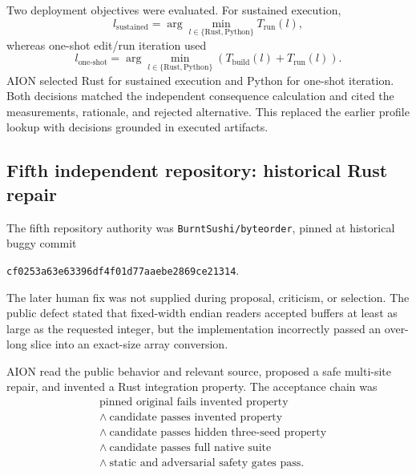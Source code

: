 Two deployment objectives were evaluated.  For sustained execution,
\begin{equation}
l_{\mathrm{sustained}}
=\arg\min_{l\in\{\mathrm{Rust},\mathrm{Python}\}}
T_{\mathrm{run}}(l),
\end{equation}
whereas one-shot edit/run iteration used
\begin{equation}
l_{\mathrm{one\mbox{-}shot}}
=\arg\min_{l\in\{\mathrm{Rust},\mathrm{Python}\}}
\left(T_{\mathrm{build}}(l)+T_{\mathrm{run}}(l)\right).
\end{equation}
AION selected Rust for sustained execution and Python for one-shot iteration.
Both decisions matched the independent consequence calculation and cited the
measurements, rationale, and rejected alternative.  This replaced the earlier
profile lookup with decisions grounded in executed artifacts.


\subsection{Fifth independent repository: historical Rust repair}
\label{subsec:fifth-rust-repository}

The fifth repository authority was
\texttt{BurntSushi/byteorder}, pinned at historical buggy commit
\begin{center}
\texttt{cf0253a63e63396df4f01d77aaebe2869ce21314}.
\end{center}
The later human fix was not supplied during proposal, criticism, or selection.
The public defect stated that fixed-width endian readers accepted buffers at
least as large as the requested integer, but the implementation incorrectly
passed an over-long slice into an exact-size array conversion.

AION read the public behavior and relevant source, proposed a safe multi-site
repair, and invented a Rust integration property.  The acceptance chain was
\begin{equation}
\begin{split}
&\text{pinned original fails invented property} \\
&\land\ \text{candidate passes invented property} \\
&\land\ \text{candidate passes hidden three-seed property} \\
&\land\ \text{candidate passes full native suite} \\
&\land\ \text{static and adversarial safety gates pass}.
\end{split}
\label{eq:fifth-repo-acceptance}
\end{equation}


